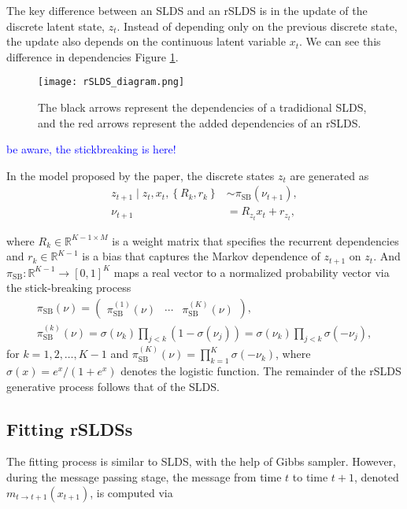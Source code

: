 The key difference between an SLDS and an rSLDS is in the update of the  discrete latent state, $z_t$. Instead of depending only on the previous discrete state, the update also depends on the continuous latent variable $x_t$. We can see this difference in dependencies Figure \ref{rSLDS}.

\begin{figure}[h!]
	\centering
	\texttt{[image: rSLDS\_diagram.png]}
	\caption{The black arrows represent the dependencies of a tradidional SLDS, and the red arrows represent the added dependencies of an rSLDS.}
	\label{rSLDS}
\end{figure}

\textcolor{blue}{be aware, the stickbreaking is here!}

In the model proposed by the paper, the discrete states $z_{t}$ are generated as
$$
\begin{aligned}
z_{t+1} \mid z_{t}, x_{t},\left\{R_{k}, r_{k}\right\} & \sim \pi_{\mathrm{SB}}\left(\nu_{t+1}\right), \\
\nu_{t+1} & =R_{z_{t}} x_{t}+r_{z_{t}},
\end{aligned}
$$

where $R_{k} \in \mathbb{R}^{K-1 \times M}$ is a weight matrix that specifies the recurrent dependencies and $r_{k} \in \mathbb{R}^{K-1}$ is a bias that captures the Markov dependence of $z_{t+1}$ on $z_{t}$. And $\pi_{\mathrm{SB}}: \mathbb{R}^{K-1} \rightarrow[0,1]^{K}$ maps a real vector to a normalized probability vector via the stick-breaking process
$$
\begin{gathered}
\pi_{\mathrm{SB}}(\nu)=\left(\begin{array}{lll}
\pi_{\mathrm{SB}}^{(1)}(\nu) & \cdots & \pi_{\mathrm{SB}}^{(K)}(\nu)
\end{array}\right), \\
\pi_{\mathrm{SB}}^{(k)}(\nu)=\sigma\left(\nu_{k}\right) \prod_{j<k}\left(1-\sigma\left(\nu_{j}\right)\right)=\sigma\left(\nu_{k}\right) \prod_{j<k} \sigma\left(-\nu_{j}\right),
\end{gathered}
$$
for $k=1,2, \ldots, K-1$ and $\pi_{\mathrm{SB}}^{(K)}(\nu)=\prod_{k=1}^{K} \sigma\left(-\nu_{k}\right)$, where $\sigma(x)=e^{x} /\left(1+e^{x}\right)$ denotes the logistic function. The remainder of the rSLDS generative process follows that of the SLDS. 

\subsection{Fitting rSLDSs} 
The fitting process is similar to SLDS, with the help of Gibbs sampler. However, during the message passing stage, the message from time $t$ to time $t+1$, denoted $m_{t \rightarrow t+1}\left(x_{t+1}\right)$, is computed via

